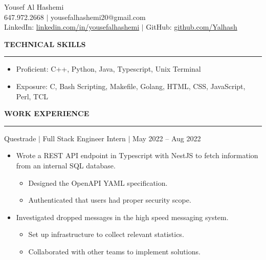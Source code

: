 \documentclass[12pt]{article}
\newcommand{\sectionRule}{\textcolor{gray}{\rule{7.27in}{0.02cm}}}
\newcommand{\sectionTxt}[1]{\noindent\textbf{#1}\\}
\newcommand{\textDate}[3]{\noindent#1 $|$ #2 $|$ {\color{textGray} #3}}
\begin{document}
    \begin{center}
        {\huge Yousef Al Hashemi}\\
        {\normalsize 647.972.2668 $|$ yousefalhashemi20@gmail.com}\\
        {\normalsize LinkedIn: \href{https://www.linkedin.com/in/yousefalhashemi}{linkedin.com/in/yousefalhashemi} $|$ GitHub: \href{https://github.com/Yalhash}{github.com/Yalhash}}\\
    \end{center}
    \sectionTxt{TECHNICAL SKILLS}
    \sectionRule
    \begin{small}
        \begin{itemize}
            \itemsep0em 
            \item Proficient: {\color{textGray}C++, Python, Java, Typescript, Unix Terminal}
            \item Exposure: {\color{textGray}C, Bash Scripting, Makefile, Golang, HTML, CSS, JavaScript, Perl, TCL}
        \end{itemize}
    \end{small}
    \sectionTxt{WORK EXPERIENCE}
    \sectionRule

    \textDate{Questrade}{Full Stack Engineer Intern}{May 2022 -- Aug 2022}
    \begin{small}
        \begin{itemize}
            \itemsep0em 
            \item {\color{textGray} Wrote a REST API endpoint in Typescript with NestJS to fetch information from an internal SQL database.}
                \begin{itemize}[label=$\circ$,topsep=-5px,partopsep=0px]
                    \itemsep0em 
                    \item {\color{textGray} Designed the OpenAPI YAML specification.}
                    \item {\color{textGray} Authenticated that users had proper security scope.}
                \end{itemize}
            \item {\color{textGray} Investigated dropped messages in the high speed messaging system.}
                \begin{itemize}[label=$\circ$,topsep=-5px,partopsep=0px]
                    \itemsep0em 
                    \item {\color{textGray} Set up infrastructure to collect relevant statistics.}
                    \item {\color{textGray} Collaborated with other teams to implement solutions.}
                \end{itemize}
        \end{itemize}
    \end{small}
\end{document}
